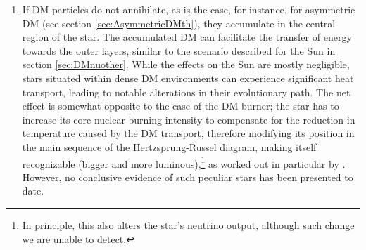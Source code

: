 \begin{enumerate}
\item 
If DM particles do not annihilate, as is the case, for instance, for asymmetric DM (see section \ref{sec:AsymmetricDMth}), they accumulate in the central region of the star.
The accumulated DM can facilitate the transfer of energy towards the outer layers, similar to the scenario described for the Sun in section \ref{sec:DMnuother}.
 While the effects on the Sun are mostly negligible, stars situated within dense DM environments can experience significant heat transport, leading to notable alterations in their evolutionary path.
The net effect is  somewhat opposite to the case of the DM burner;
the star has to increase its core nuclear burning intensity to compensate for the reduction in temperature caused by the DM transport, therefore modifying its position in the main sequence of the Hertzsprung-Russel diagram, making itself recognizable (bigger and more luminous),\footnote{In principle, this also alters the star's neutrino output, although such change we are unable to detect.}
as worked out in particular by  \cite{DMinSunlikeStars}. 
However, no conclusive evidence of such peculiar stars has been presented to date.



\end{enumerate}


